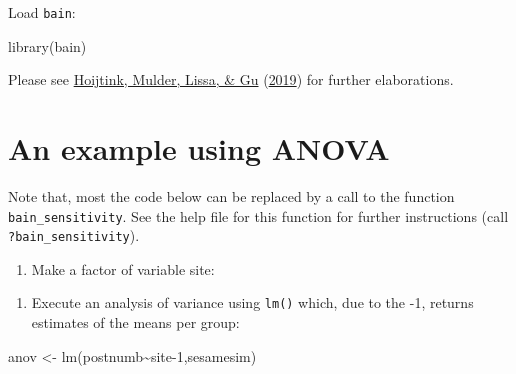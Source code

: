 \documentclass[
]{book}
\newenvironment{Shaded}{\begin{snugshade}}{\end{snugshade}}
\newcommand{\DecValTok}[1]{\textcolor[rgb]{0.00,0.00,0.81}{#1}}
\newcommand{\FunctionTok}[1]{\textcolor[rgb]{0.00,0.00,0.00}{#1}}
\newcommand{\NormalTok}[1]{#1}
\newcommand{\OtherTok}[1]{\textcolor[rgb]{0.56,0.35,0.01}{#1}}
\newcommand{\SpecialCharTok}[1]{\textcolor[rgb]{0.00,0.00,0.00}{#1}}
\providecommand{\tightlist}{%
  \setlength{\itemsep}{0pt}\setlength{\parskip}{0pt}}
\begin{document}
Load \texttt{bain}:

\begin{Shaded}
\begin{Highlighting}[]
\FunctionTok{library}\NormalTok{(bain)}
\end{Highlighting}
\end{Shaded}

Please see \protect\hyperlink{ref-hoijtink2019tutorial}{Hoijtink, Mulder, Lissa, \& Gu} (\protect\hyperlink{ref-hoijtink2019tutorial}{2019}) for further elaborations.

\hypertarget{an-example-using-anova}{%
\section{An example using ANOVA}\label{an-example-using-anova}}

Note that, most the code below can be replaced by a call to the function \texttt{bain\_sensitivity}. See the help file for this function for further instructions (call \texttt{?bain\_sensitivity}).

\begin{enumerate}
\def\labelenumi{\arabic{enumi})}
\tightlist
\item
  Make a factor of variable site:
\end{enumerate}

\begin{Shaded}
\end{Shaded}

\begin{enumerate}
\def\labelenumi{\arabic{enumi})}
\setcounter{enumi}{1}
\tightlist
\item
  Execute an analysis of variance using \texttt{lm()} which, due to the -1, returns estimates of the means per group:
\end{enumerate}

\begin{Shaded}
\begin{Highlighting}[]
\NormalTok{anov }\OtherTok{\textless{}{-}} \FunctionTok{lm}\NormalTok{(postnumb}\SpecialCharTok{\textasciitilde{}}\NormalTok{site}\DecValTok{{-}1}\NormalTok{,sesamesim)}
\end{Highlighting}
\end{Shaded}
\end{document}
